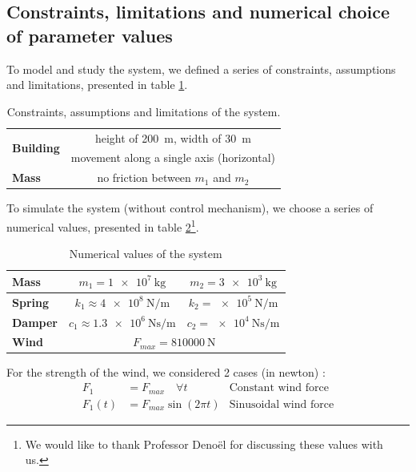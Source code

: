 \subsection{Constraints, limitations and numerical choice of parameter values}
To model and study the system, we defined a series of constraints, assumptions and limitations, presented in table \ref{tab:constraints_assumptions_limitations}.\par
\begin{table}[H]
    \centering
    \begin{tabular}{|l|c|}
        \hline
        \multirow{2}{*}{{\bf Building}} & height of \SI{200}{\meter}, width of \SI{30}{\meter}\\ & movement along a single axis (horizontal)\\\hline
        {\bf Mass} & no friction between $m_1$ and $m_2$\\ \hline
    \end{tabular}
    \caption{Constraints, assumptions and limitations of the system.}
    \label{tab:constraints_assumptions_limitations}
\end{table}
To simulate the system (without control mechanism), we choose a series of numerical values, presented in table \ref{tab:numerical_values}\footnote{We would like to thank Professor Denoël for discussing these values with us.}.
\begin{table}[H]
    \centering
    \begin{tabular}{|l|c|c|}
        \hline
        {\bf Mass} & $m_1 = \SI{1e7}{\kilogram}$ & $m_2 = \SI{3e3}{\kilogram}$\\ \hline
        {\bf Spring} & $k_1 \approx \SI{4e8}{\newton/\meter}$ & $k_2 = \SI{e5}{\newton/\meter}$\\ \hline
        {\bf Damper} & $c_1 \approx \SI{1.3e6}{\newton\second/\meter}$ & $c_2 = \SI{e4}{\newton\second/\meter}$\\ \hline
        {\bf Wind} & \multicolumn{2}{c|}{$F_{max} = \SI{810000}{\newton}$}\\ \hline
    \end{tabular}
    \caption{Numerical values of the system}
    \label{tab:numerical_values}
\end{table}
For the strength of the wind, we considered 2 cases (in newton) :
\begin{align*}
    F_1 &= F_{max}\quad\forall t & \text{Constant wind force}\\
    F_1(t) &= F_{max}\sin(2\pi t) & \text{Sinusoidal wind force}
\end{align*}
